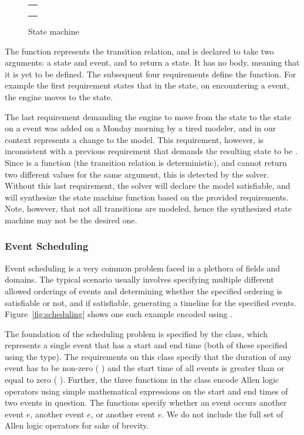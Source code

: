 \begin{figure}[htb]
\centering
\begin{tabular}{c}
\hline \\
 \\ \\
\hline
\end{tabular}
\caption{State machine}
\label{fig:statemachine}
\end{figure}

The function  represents the transition relation, and is
declared to take two arguments: a state and event, and to return a
state.  It has no body, meaning that it is yet to be defined. The
subsequent four requirements define the  function. For
example the first requirement states that in the  state, on
encountering a  event, the engine moves to the
 state.

The last requirement demanding the engine to move from the
 state to the  state on a  event was
added on a Monday morning by a tired modeler, and in our context
represents a change to the model.  This requirement, however, is
inconsistent with a previous requirement that demands the resulting
state to be .  Since  is a function (the
transition relation is deterministic), and cannot return two different
values for the same argument, this is detected by the solver.  Without
this last requirement, the solver will declare the model satisfiable,
and will synthesize the state machine function based on the provided
requirements.  Note, however, that not all transitions are modeled,
hence the synthesized state machine may not be the desired one.

\subsubsection{Event Scheduling}

Event scheduling is a very common problem faced in a plethora of
fields and domains. The typical scenario usually involves specifying
multiple different allowed orderings of events and determining whether
the specified ordering is satisfiable or not, and if satisfiable,
generating a timeline for the specified events.
Figure~\ref{fig:scheduling} shows one such example encoded using
\Klang{}.

The foundation of the scheduling problem is specified by the
 class, which represents a single event that has a start
and end time (both of these specified using the  type). The
requirements on this class specify that the duration of any event has
to be non-zero ( ) and the start time
of all events is greater than or equal to zero (
). Further, the three functions in the 
class encode Allen logic operators \cite{allen-logic-84} 
using simple mathematical
expressions on the start and end times of two events in
question. The functions specify whether an event occurs
 another event $e$,  another event $e$, or
 another event $e$. We do not include the full set of
Allen logic operators for sake of brevity. 

